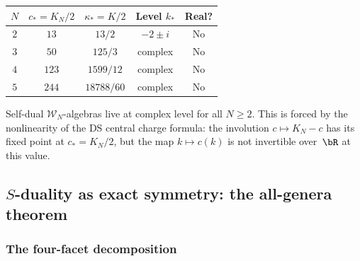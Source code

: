 \begin{computation}
\renewcommand{\arraystretch}{1.4}
\begin{center}
\begin{tabular}{ccccc}
\toprule
$N$ & $c_* = K_N/2$ & $\kappa_* = K/2$ & Level $k_*$ & Real? \\
\midrule
$2$ & $13$ & $13/2$ & $-2 \pm i$ & No \\
$3$ & $50$ & $125/3$ & complex & No \\
$4$ & $123$ & $1599/12$ & complex & No \\
$5$ & $244$ & $18788/60$ & complex & No \\
\bottomrule
\end{tabular}
\end{center}
Self-dual $\mathcal{W}_N$-algebras live at complex level for all
$N \geq 2$. This is forced by the nonlinearity of the DS central
charge formula: the involution $c \mapsto K_N - c$ has its fixed
point at $c_* = K_N/2$, but the map $k \mapsto c(k)$ is not
invertible over~$\bR$ at this value.
\end{computation}

%
%

\subsection{$S$-duality as exact symmetry: the all-genera theorem}

\subsubsection{The four-facet decomposition}

